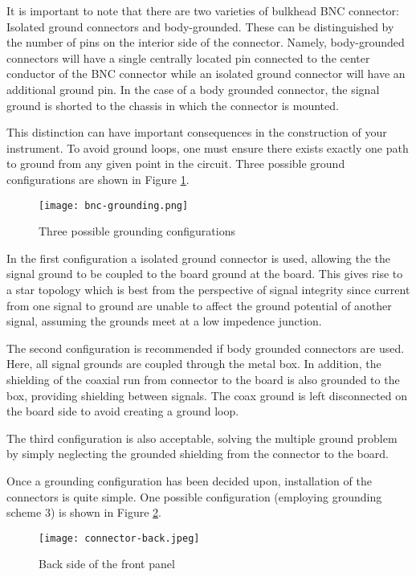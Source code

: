 It is important to note that there are two varieties of bulkhead BNC
connector: Isolated ground connectors and body-grounded. These can be
distinguished by the number of pins on the interior side of the
connector. Namely, body-grounded connectors will have a single
centrally located pin connected to the center conductor of the BNC
connector while an isolated ground connector will have an additional
ground pin. In the case of a body grounded connector, the signal
ground is shorted to the chassis in which the connector is mounted.

This distinction can have important consequences in the construction
of your instrument. To avoid ground loops, one must ensure there
exists exactly one path to ground from any given point in the circuit.
Three possible ground configurations are shown in Figure \ref{fig:grounding}.

\begin{figure}
  \center
  \texttt{[image: bnc-grounding.png]}
  \caption{Three possible grounding configurations}
  \label{fig:grounding}
\end{figure}

In the first configuration a isolated ground connector is used,
allowing the the signal ground to be coupled to the board ground
at the board. This gives rise to a star topology which is best
from the perspective of signal integrity since current from one signal
to ground are unable to affect the ground potential of another signal,
assuming the grounds meet at a low impedence junction.

The second configuration is recommended if body grounded connectors
are used. Here, all signal grounds are coupled through the metal
box. In addition, the shielding of the coaxial run from connector to
the board is also grounded to the box, providing shielding between
signals. The coax ground is left disconnected on the board side to
avoid creating a ground loop.

The third configuration is also acceptable, solving the multiple
ground problem by simply neglecting the grounded shielding from the
connector to the board.

Once a grounding configuration has been decided upon, installation of
the connectors is quite simple. One possible configuration (employing
grounding scheme 3) is shown in Figure \ref{fig:front-panel-rear}.

\begin{figure}
  \center
  \texttt{[image: connector-back.jpeg]}
  \caption{Back side of the front panel}
  \label{fig:front-panel-rear}
\end{figure}

